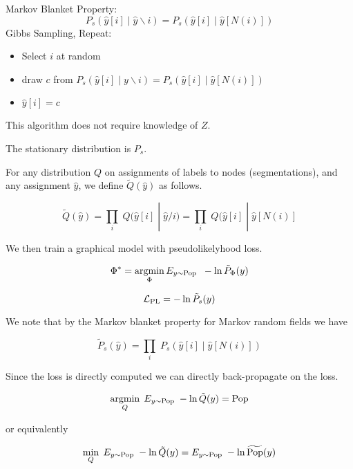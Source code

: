 {

Markov Blanket Property:
{\color{red} $$P_s(\hat{y}[i] \;|\;\hat{y} \backslash i) = P_s(\hat{y}[i] \;|\; \hat{y}[N(i)])$$}
\vfill
Gibbs Sampling, Repeat:

\begin{itemize}
\item   Select $i$ at random

\item {\color{red} draw $c$ from $P_s(\hat{y}[i]\;|\;y\backslash i) = P_s(\hat{y}[i] \;|\;\hat{y}[N(i)])$}

\item $\hat{y}[i] = c$
\end{itemize}

\vfill
This algorithm does not require knowledge of $Z$.

\vfill
The stationary distribution is $P_s$.


For any distribution {\color{red} $Q$} on assignments of labels to nodes (segmentations), and any assignment {\color{red} $\hat{y}$},
we define {\color{red} $\tilde{Q}(\hat{y})$} as follows.

{\color{red} $$\tilde{Q}(\hat{y}) = \prod_i\;Q(\hat{y}[i]\;|\; \hat{y}/i) = \prod_i\;Q(\hat{y}[i]\;|\; \hat{y}[N(i)]$$}

We then train a graphical model with pseudolikelyhood loss.

{\color{red} $$\Phi^* = \operatorname*{argmin}_\Phi E_{y \sim \mathrm{Pop}}\;\;-\ln \tilde{P}_\Phi(y)$$}



{\color{red} $${\cal L}_{\mathrm{PL}} = - \ln \tilde{P}_s(y)$$}

\vfill
We note that by the Markov blanket property for Markov random fields we have

{\color{red} $$\tilde{P}_s(\hat{y}) = \prod_i\;P_s(\hat{y}[i]\;|\; \hat{y}[N(i)])$$}

\vfill
Since the loss is directly computed we can directly back-propagate on the loss.




{\color{red} $$\operatorname*{argmin}_Q \; E_{y \sim \mathrm{Pop}} \;-\ln \tilde{Q}(y) = \mathrm{Pop}$$}

\vfill
or equivalently


\vfill
{\color{red} $$\min_Q \; E_{y \sim \mathrm{Pop}} \;-\ln \tilde{Q}(y) = E_{y \sim \mathrm{Pop}}\;-\ln \widetilde{\mathrm{Pop}}(y)$$}
\vfill


}
